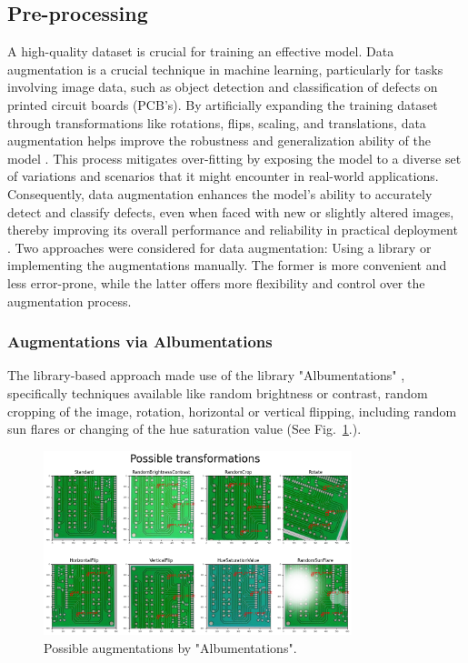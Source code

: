 \documentclass[12pt]{article}
\begin{document}
\subsection{Pre-processing}
A high-quality dataset is crucial for training an effective model. Data augmentation is a crucial technique in machine learning, 
particularly for tasks involving image data, such as object detection and classification of defects on printed circuit boards (PCB's). 
By artificially expanding the training dataset through transformations like rotations, flips, scaling, and translations, data augmentation 
helps improve the robustness and generalization ability of the model \cite{Cubuk2020AutoAugment}. This process mitigates over-fitting by exposing the model to a diverse 
set of variations and scenarios that it might encounter in real-world applications. Consequently, data augmentation enhances the model's 
ability to accurately detect and classify defects, even when faced with new or slightly altered images, thereby improving its overall 
performance and reliability in practical deployment \cite{Cubuk2020AutoAugment}.
Two approaches were considered for data augmentation: Using a library or implementing the augmentations manually. The former is more convenient and less error-prone, while the latter offers more flexibility and control over the augmentation process. 

\subsubsection{Augmentations via Albumentations}

The library-based approach made use of the library "Albumentations" \cite{AlbumentationsDocs}, specifically techniques available like random brightness or contrast, random cropping of the image, rotation, horizontal or vertical flipping, including random sun flares or changing of the hue saturation value (See Fig.~\ref{fig:Albumentations}.).

\begin{figure}[h]
    \centering
    \includegraphics[width=0.8\textwidth]{./graphics/5.png}
    \caption{Possible augmentations by "Albumentations".}
    \label{fig:Albumentations}
\end{figure}
\end{document}

